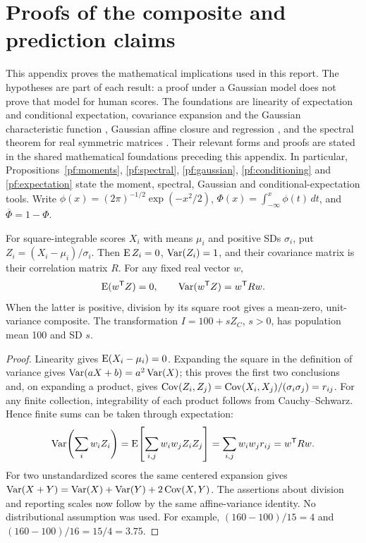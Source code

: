 \chapter{Proofs of the composite and prediction claims}
\label{hfpr:appendix}

This appendix proves the mathematical implications used in this report.
The hypotheses are part of each result: a proof under a Gaussian model
does not prove that model for human scores. The foundations are linearity
of expectation and conditional expectation, covariance expansion and the
Gaussian characteristic function \citep[Sections 1.6, 3.3 and 4.1]{durrett2019},
Gaussian affine closure and regression \citep[Theorems 3.3.1--3.3.2 and
3.5.1--3.5.2]{gallager2013}, and the spectral theorem for real symmetric
matrices \citep[Theorem 7.29]{axler2024}. Their relevant forms and proofs
are stated in the shared mathematical foundations preceding this appendix.
In particular, Propositions~\ref{pf:moments}, \ref{pf:spectral},
\ref{pf:gaussian}, \ref{pf:conditioning} and \ref{pf:expectation}
state the moment, spectral, Gaussian and conditional-expectation tools.
Write \(\phi(x)=(2\pi)^{-1/2}\exp(-x^2/2)\),
\(\Phi(x)=\int_{-\infty}^x\phi(t)\,dt\), and
\(\overline\Phi=1-\Phi\).

\begin{proposition}
\label{hfpr:standardization}
For square-integrable scores \(X_i\) with means \(\mu_i\) and positive
SDs \(\sigma_i\), put \(Z_i=(X_i-\mu_i)/\sigma_i\). Then
\(\operatorname{E} Z_i=0\), \(\operatorname{Var}(Z_i)=1\), and their covariance matrix is their
correlation matrix \(R\). For any fixed real vector \(w\),
\[
 \operatorname{E}(w^{\mathsf T}Z)=0,\qquad
 \operatorname{Var}(w^{\mathsf T}Z)=w^{\mathsf T}Rw.
\]
When the latter is positive, division by its square root gives a mean-zero,
unit-variance composite. The transformation \(I=100+sZ_C\), \(s>0\),
has population mean 100 and SD \(s\).
\end{proposition}
\begin{proof}
Linearity gives \(\operatorname{E}(X_i-\mu_i)=0\). Expanding the square in the
definition of variance gives \(\operatorname{Var}(aX+b)=a^2\operatorname{Var}(X)\); this proves
the first two conclusions and, on expanding a product, gives
\(\operatorname{Cov}(Z_i,Z_j)=\operatorname{Cov}(X_i,X_j)/(\sigma_i\sigma_j)=r_{ij}\).
For any finite collection, integrability of each product follows from
Cauchy--Schwarz. Hence finite sums can be taken through expectation:
\[
 \operatorname{Var}\!\left(\sum_iw_iZ_i\right)
 =\operatorname{E}\!\left[\sum_{i,j}w_iw_jZ_iZ_j\right]
 =\sum_{i,j}w_iw_jr_{ij}=w^{\mathsf T}Rw.
\]
For two unstandardized scores the same centered expansion gives
\(\operatorname{Var}(X+Y)=\operatorname{Var}(X)+\operatorname{Var}(Y)+2\operatorname{Cov}(X,Y)\).
The assertions about division and reporting scales now follow by the
same affine-variance identity. No distributional assumption was used.
For example, \((160-100)/15=4\) and \((160-100)/16=15/4=3.75\).
\end{proof}

